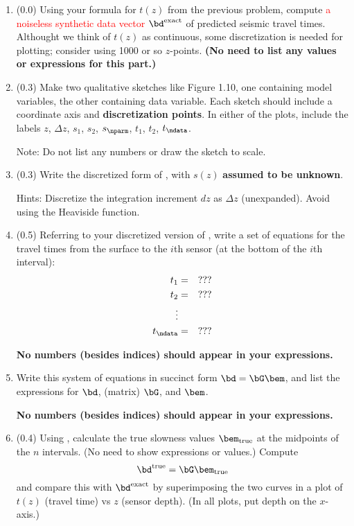 \documentclass[11pt,titlepage,fleqn]{article}
\begin{document}
\begin{enumerate}

\item (0.0) Using your formula for $t(z)$ from the previous problem, compute \textcolor{red}{a noiseless synthetic data vector $\bd^{\rm exact}$} of predicted seismic travel times. Althought we think of $t(z)$ as continuous, some discretization is needed for plotting; consider using 1000 or so $z$-points. 
{\bf (No need to list any values or expressions for this part.)}

\item (0.3)  Make two qualitative sketches like Figure 1.10, one containing model variables, the other containing data variable. Each sketch should include a coordinate axis and {\bf discretization points}. In either of the plots, include the labels $z$, $\Delta z$, $s_1$, $s_2$, $s_\nparm$, $t_1$, $t_2$, $t_\ndata$.

Note: Do not list any numbers or draw the sketch to scale.


\item (0.3) Write the discretized form of , with $s(z)$ {\bf assumed to be unknown}.

Hints: Discretize the integration increment $dz$ as $\Delta z$ (unexpanded). Avoid using the Heaviside function.


\item (0.5) Referring to your discretized version of , write a set of equations for the travel times from the surface to the $i$th sensor (at the bottom of the $i$th interval):
%
\begin{eqnarray*}
t_1 &=& ???
\\
t_2 &=& ???
\\
\vdots
\\
t_\ndata &=& ???
\end{eqnarray*}

{\bf No numbers (besides indices) should appear in your expressions.}


\item Write this system of equations in succinct form $\bd = \bG\bem$, and list the expressions for $\bd$, (matrix) $\bG$, and $\bem$.

{\bf No numbers (besides indices) should appear in your expressions.}


\item (0.4) Using , calculate the true slowness values $\bem_{\rm true}$ at the midpoints of the $n$ intervals. (No need to show expressions or values.) Compute
%
\begin{equation}
\bd^{\rm true} = \bG\bem_{\rm true}
\end{equation}
%
and compare this with $\bd^{\rm exact}$ by superimposing the two curves in a plot of $t(z)$ (travel time) vs $z$ (sensor depth). (In all plots, put depth on the $x$-axis.)


\end{enumerate}
\end{document}
